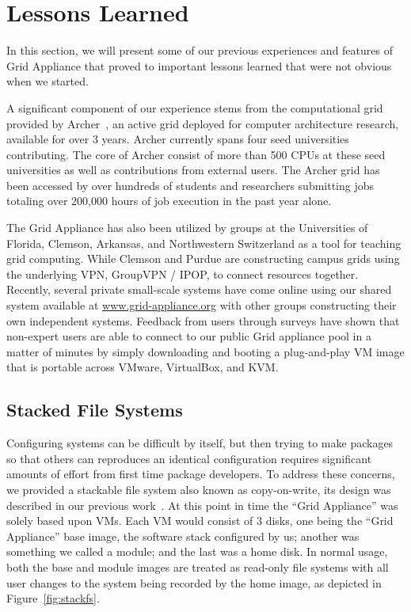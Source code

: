 \documentclass[conference]{IEEEtran}
\begin{document}
\section{Lessons Learned}
\label{lessons_learned}

In this section, we will present some of our previous experiences and features
of Grid Appliance that proved to important lessons learned that were not
obvious when we started.

A significant component of our experience stems from the computational grid
provided by Archer~\cite{archer}, an active grid deployed for computer
architecture research, available for over 3 years.  Archer currently spans four
seed universities contributing.  The core of Archer consist of more than 500
CPUs at these seed universities as well as contributions from external users.
The Archer grid has been accessed by over hundreds of students and researchers
submitting jobs totaling over 200,000 hours of job execution in the past year
alone.

The Grid Appliance has also been utilized by groups at the Universities of
Florida, Clemson, Arkansas, and Northwestern Switzerland as a tool for teaching
grid computing.  While Clemson and Purdue are constructing campus grids using
the underlying VPN, GroupVPN / IPOP, to connect resources together.  Recently,
several private small-scale systems have come online using our shared system
available at \url{www.grid-appliance.org} with other groups constructing their
own independent systems.  Feedback from users through surveys have shown that
non-expert users are able to connect to our public Grid appliance pool in a
matter of minutes by simply downloading and booting a plug-and-play VM image
that is portable across VMware, VirtualBox, and KVM.

\subsection{Stacked File Systems}

Configuring systems can be difficult by itself, but then trying to make
packages so that others can reproduces an identical configuration requires
significant amounts of effort from first time package developers.  To address
these concerns, we provided a stackable file system also known as
copy-on-write, its design was described in our previous work~\cite{vtdc}.  At
this point in time the ``Grid Appliance'' was solely based upon VMs.  Each VM
would consist of 3 disks, one being the ``Grid Appliance'' base image, the
software stack configured by us; another was something we called a module; and
the last was a home disk.  In normal usage, both the base and module images are
treated as read-only file systems with all user changes to the system being
recorded by the home image, as depicted in Figure~\ref{fig:stackfs}.
\end{document}
